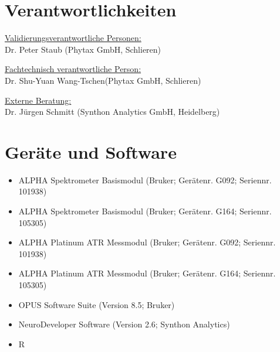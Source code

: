 \documentclass[11pt, a4paper]{article}
\begin{document}
\section{Verantwortlichkeiten}
\uline{Validierungsverantwortliche Personen:}\\
Dr. Peter Staub (Phytax GmbH, Schlieren)

\uline{Fachtechnisch verantwortliche Person:}\\
Dr. Shu-Yuan Wang-Tschen(Phytax GmbH, Schlieren)

\uline{Externe Beratung:}\\
Dr. Jürgen Schmitt (Synthon Analytics GmbH, Heidelberg)


\section{Geräte und Software}
\begin{itemize}
\item ALPHA Spektrometer Basismodul (Bruker; Gerätenr. G092; Seriennr. 101938)
\item ALPHA Spektrometer Basismodul (Bruker; Gerätenr. G164; Seriennr. 105305)
\item ALPHA Platinum ATR Messmodul (Bruker; Gerätenr. G092; Seriennr. 101938)
\item ALPHA Platinum ATR Messmodul (Bruker; Gerätenr. G164; Seriennr. 105305)
\item OPUS Software Suite (Version 8.5; Bruker)
\item NeuroDeveloper Software (Version 2.6; Synthon Analytics)
\item R
\end{itemize}
\end{document}
